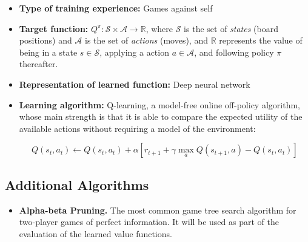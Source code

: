 \documentclass{article}
\begin{document}
\begin{itemize}

    \item \textbf{Type of training experience:} Games against self

    \item \textbf{Target function:} $Q^\pi : \mathcal{S} \times \mathcal{A} \to \mathbb{R}$, where
        $\mathcal{S}$ is the set of \emph{states} (board positions) and $\mathcal{A}$ is the set of
        \emph{actions} (moves), and $\mathbb{R}$ represents the value of being in a state $s \in
        \mathcal{S}$, applying a action $a \in \mathcal{A}$, and following policy $\pi$ thereafter.

    \item \textbf{Representation of learned function:} Deep neural network

    \item \textbf{Learning algorithm:} Q-learning, a model-free online off-policy algorithm, whose
        main strength is that it is able to compare the expected utility of the available actions
        without requiring a model of the environment:

        \begin{equation}
        Q(s_t, a_t) \gets Q(s_t, a_t) + \alpha [r_{t+1} + \gamma \max_a Q(s_{t+1}, a) - Q(s_t, a_t)]
        \end{equation}


\end{itemize}

\subsection{Additional Algorithms}

\begin{itemize}

    \item \textbf{Alpha-beta Pruning.} The most common game tree search algorithm for two-player
        games of perfect information. It will be used as part of the evaluation of the learned value
        functions.

\end{itemize}




\end{document}
